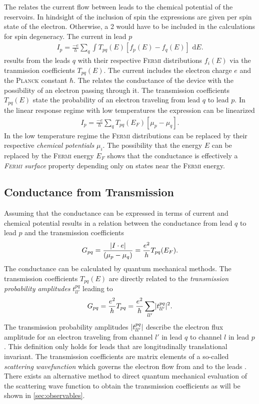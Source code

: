 The \lanbform{} relates the current flow between leads to the chemical potential of the reservoirs. In hindsight of the inclusion of spin the expressions are given per spin state of the electron. Otherwise, a 2  would have to be included in the calculations for spin degeneracy. The current in lead $p$ \cite{PhysRevLett.68.2512}
\begin{align}
I_p=\frac{-e}{h} \sum_q \int T_{pq}(E) [f_p(E) - f_q(E)] \text{ d}E.
\label{eqn:current}
\end{align}
results from the leads $q$ with their respective \textsc{Fermi} distributions $f_i(E)$ via the tranmission coefficients $T_{pq}(E)$. The current includes the electron charge $e$ and the \textsc{Planck} constant $\hbar$. The \lanbform{} relates the conductance of the device with the possibility of an electron passing through it. The transmission coefficients $T_{pq}(E)$ state the probability of an electron traveling from lead $q$ to lead $p$. 
In the linear response regime with low temperatures the expression can be linearized 
\begin{align}
I_p=\frac{-e}{h} \sum_q T_{pq}(E_F) [\mu_p - \mu_q].
\label{eqn:currentlin}
\end{align}
In the low temperature regime the \textsc{Fermi} distributions can be replaced by their respective \emph{chemical potentials} $\mu_i$. The possibility that the energy $E$ can be replaced by the \textsc{Fermi} energy $E_F$ shows that the conductance is effectively a \emph{\textsc{Fermi} surface} property depending only on states near the \textsc{Fermi} energy.
\subsection{Conductance from Transmission}\label{sec:conductancefromtransmission}
Assuming that the conductance can be expressed in terms of current and chemical potential results in a relation between the conductance from lead $q$ to lead $p$ and the transmission coefficients 
\begin{align}
G_{pq}=\frac{\lvert I\cdot e\rvert}{(\mu_p - \mu_q)}=\frac{e^2}{h} T_{pq}(E_F).
\label{eqn:conductance}
\end{align}
The conductance can be calculated by quantum mechanical methods. The transmission coefficients $T_{pq}(E)$ are directly related to the \emph{transmission probability amplitudes} $t^{pq}_{ll'}$ leading to
\begin{align}
G_{pq}=\frac{e^2}{h} T_{pq} =\frac{e^2}{h} \sum_{ll'} \lvert t^{pq}_{ll'}\rvert^2.
\label{eqn:transcoeff}
\end{align}
The transmission probability amplitudes $\lvert t^{pq}_{ll'}\rvert$ describe the electron flux amplitude for an electron traveling from channel $l'$ in lead $q$ to channel $l$ in lead $p$. This definition only holds for leads that are longitudinally translational invariant. The transmission coefficients are matrix elements of a so-called \emph{scattering wavefunction} which governs the electron flow from and to the leads \cite{Datta1997}. There exists an alternative method to direct quantum mechanical evaluation of the scattering wave function to obtain the transmission coefficients as will be shown in \cref{sec:observables}.
